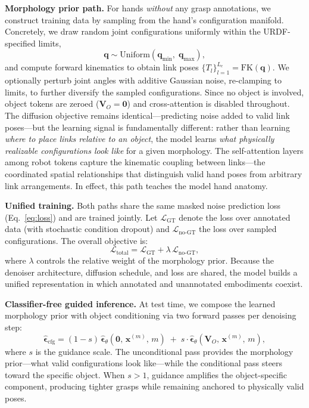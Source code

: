 \noindent\textbf{Morphology prior path.}
For hands \emph{without} any grasp annotations, we construct training data by sampling from the hand's configuration manifold.
Concretely, we draw random joint configurations uniformly within the URDF-specified limits,
\begin{equation}
    \mathbf{q} \sim \mathrm{Uniform}(\mathbf{q}_{\min},\; \mathbf{q}_{\max}),
\end{equation}
and compute forward kinematics to obtain link poses $\{T_l\}_{l=1}^{L_e} = \mathrm{FK}(\mathbf{q})$.
We optionally perturb joint angles with additive Gaussian noise, re-clamping to limits, to further diversify the sampled configurations.
Since no object is involved, object tokens are zeroed ($\mathbf{V}_O = \mathbf{0}$) and cross-attention is disabled throughout.
The diffusion objective remains identical---predicting noise added to valid link poses---but the learning signal is fundamentally different: rather than learning \emph{where to place links relative to an object}, the model learns \emph{what physically realizable configurations look like} for a given morphology.
The self-attention layers among robot tokens capture the kinematic coupling between links---the coordinated spatial relationships that distinguish valid hand poses from arbitrary link arrangements.
In effect, this path teaches the model hand anatomy.

\noindent\textbf{Unified training.}
Both paths share the same masked noise prediction loss (Eq.~\ref{eq:loss}) and are trained jointly.
Let $\mathcal{L}_\text{GT}$ denote the loss over annotated data (with stochastic condition dropout) and $\mathcal{L}_\text{no-GT}$ the loss over sampled configurations. The overall objective is:
\begin{equation}
    \mathcal{L}_\text{total} = \mathcal{L}_{\text{GT}} + \lambda\, \mathcal{L}_{\text{no-GT}},
    \label{eq:unified_loss}
\end{equation}
where $\lambda$ controls the relative weight of the morphology prior.
Because the denoiser architecture, diffusion schedule, and loss are shared, the model builds a unified representation in which annotated and unannotated embodiments coexist.

\noindent\textbf{Classifier-free guided inference.}
At test time, we compose the learned morphology prior with object conditioning via two forward passes per denoising step:
\begin{equation}
    \hat{\boldsymbol{\epsilon}}_{\text{cfg}} = (1 - s)\,\hat{\boldsymbol{\epsilon}}_\theta(\mathbf{0},\, \mathbf{x}^{(m)},\, m) \;+\; s \cdot \hat{\boldsymbol{\epsilon}}_\theta(\mathbf{V}_O,\, \mathbf{x}^{(m)},\, m),
    \label{eq:cfg_inference}
\end{equation}
where $s$ is the guidance scale.
The unconditional pass provides the morphology prior---what valid configurations look like---while the conditional pass steers toward the specific object.
When $s > 1$, guidance amplifies the object-specific component, producing tighter grasps while remaining anchored to physically valid poses.

